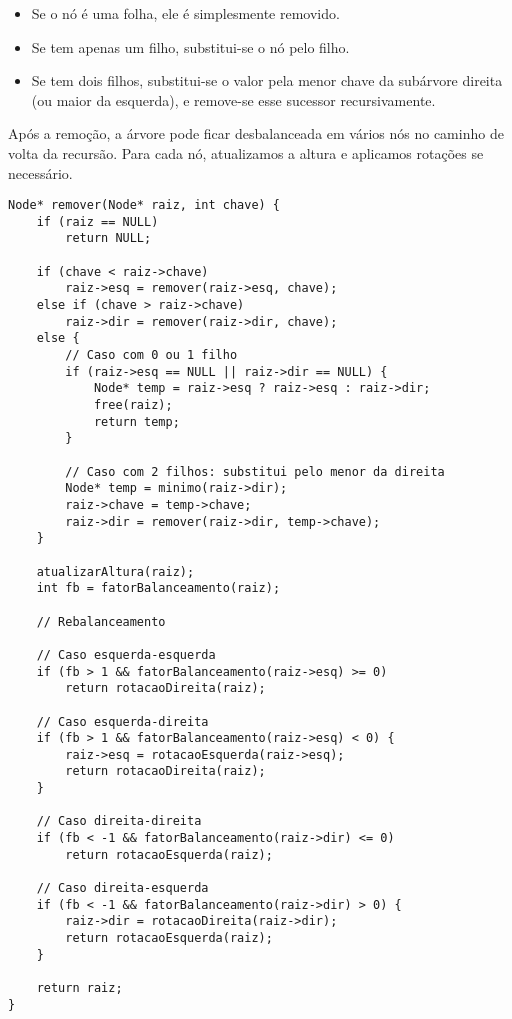 \begin{itemize}
    \item Se o nó é uma folha, ele é simplesmente removido.
    \item Se tem apenas um filho, substitui-se o nó pelo filho.
    \item Se tem dois filhos, substitui-se o valor pela menor chave da subárvore direita (ou maior da esquerda), e remove-se esse sucessor recursivamente.
\end{itemize}

Após a remoção, a árvore pode ficar desbalanceada em vários nós no caminho de volta da recursão. 
Para cada nó, atualizamos a altura e aplicamos rotações se necessário.

\begin{lstlisting}
Node* remover(Node* raiz, int chave) {
    if (raiz == NULL)
        return NULL;

    if (chave < raiz->chave)
        raiz->esq = remover(raiz->esq, chave);
    else if (chave > raiz->chave)
        raiz->dir = remover(raiz->dir, chave);
    else {
        // Caso com 0 ou 1 filho
        if (raiz->esq == NULL || raiz->dir == NULL) {
            Node* temp = raiz->esq ? raiz->esq : raiz->dir;
            free(raiz);
            return temp;
        }

        // Caso com 2 filhos: substitui pelo menor da direita
        Node* temp = minimo(raiz->dir);
        raiz->chave = temp->chave;
        raiz->dir = remover(raiz->dir, temp->chave);
    }

    atualizarAltura(raiz);
    int fb = fatorBalanceamento(raiz);

    // Rebalanceamento

    // Caso esquerda-esquerda
    if (fb > 1 && fatorBalanceamento(raiz->esq) >= 0)
        return rotacaoDireita(raiz);

    // Caso esquerda-direita
    if (fb > 1 && fatorBalanceamento(raiz->esq) < 0) {
        raiz->esq = rotacaoEsquerda(raiz->esq);
        return rotacaoDireita(raiz);
    }

    // Caso direita-direita
    if (fb < -1 && fatorBalanceamento(raiz->dir) <= 0)
        return rotacaoEsquerda(raiz);

    // Caso direita-esquerda
    if (fb < -1 && fatorBalanceamento(raiz->dir) > 0) {
        raiz->dir = rotacaoDireita(raiz->dir);
        return rotacaoEsquerda(raiz);
    }

    return raiz;
}
\end{lstlisting}

